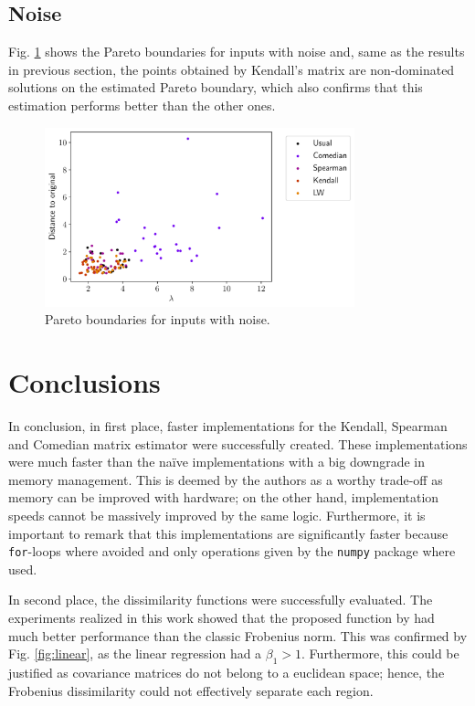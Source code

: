 \documentclass[11pt]{article}
\theoremstyle{definition}
\theoremstyle{remark}
\theoremstyle{remark}
\theoremstyle{remark}
\begin{document}
\subsection{Noise}
Fig. \ref{fig:paretonoise} shows the Pareto boundaries for inputs with noise
and, same as the results in previous section, the points obtained by Kendall's
matrix are non-dominated solutions on the estimated Pareto boundary, which also
confirms that this estimation performs better than the other ones.

\begin{figure}[H]
  \centering \includegraphics[width=0.8\textwidth]{figs/noise-scatter.pdf}
  \caption{Pareto boundaries for inputs with noise.}
  \label{fig:paretonoise}
\end{figure}

\section{Conclusions}\label{sec:conc}

In conclusion, in first place, faster implementations for the Kendall, Spearman
and Comedian matrix estimator were successfully created. These implementations
were much faster than the naïve implementations with a big downgrade in memory
management. This is deemed by the authors as a worthy trade-off as memory can be
improved with hardware; on the other hand, implementation speeds cannot be
massively improved by the same logic. Furthermore, it is important to remark
that this implementations are significantly faster because \texttt{for}-loops
where avoided and only operations given by the \texttt{numpy} package where
used.

In second place, the dissimilarity functions were successfully evaluated. The
experiments realized in this work showed that the proposed function by
\textcite{tuzel2006} had much better performance than the classic Frobenius
norm. This was confirmed by Fig. \ref{fig:linear}, as the linear regression had
a $\beta_1 > 1$. Furthermore, this could be justified as covariance matrices do
not belong to a euclidean space; hence, the Frobenius dissimilarity could not
effectively separate each region.
\end{document}
